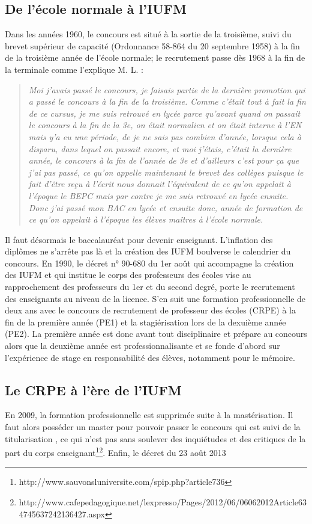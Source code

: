 \documentclass[a4paper,11pt]{article}
\begin{document}
			\subsection{De l'école normale à l'IUFM}
					Dans les années 1960, le concours est situé à la sortie de la troisième, suivi du brevet supérieur de capacité (Ordonnance 58-864 du 20 septembre 1958) à la fin de la troisième année de l'école normale; le recrutement passe dès 1968 à la fin de la terminale comme l'explique M. L. :
			\begin{quote}
			\emph{Moi j'avais passé le concours, je faisais partie de la dernière promotion qui a passé le concours à la fin de la troisième. Comme c'était tout à fait la fin de ce cursus, je me suis retrouvé en lycée parce qu'avant quand on passait le concours à la fin de la 3e, on était normalien et on était interne à l'EN mais y'a eu une période, de je ne sais pas combien d'année, lorsque cela à disparu, dans lequel on passait encore, et moi j'étais, c'était la dernière année, le concours à la fin de l'année de 3e et d'ailleurs c'est pour ça que j'ai pas passé, ce qu'on appelle maintenant le brevet des collèges puisque le fait d'être reçu à l'écrit nous donnait l'équivalent de ce qu'on appelait à l'époque le BEPC mais par contre je me suis retrouvé en lycée ensuite. Donc j'ai passé mon BAC en lycée et ensuite donc, année de formation de ce qu'on appelait à l'époque les élèves maîtres à l'école normale.}
			\end{quote}
			Il faut désormais le baccalauréat pour devenir enseignant. L'inflation des diplômes ne s'arrête pas là et la création des IUFM boulverse le calendrier du concours. En 1990, le décret n° 90-680 du 1er août qui accompagne la création des IUFM et qui institue le corps des professeurs des écoles vise au rapprochement des professeurs du 1er et du second degré, porte le recrutement des enseignants au niveau de la licence. S'en suit une formation professionnelle de deux ans avec le concours de recrutement de professeur des écoles (CRPE) à la fin de la première année (PE1) et la stagiérisation lors de la dexuième année (PE2). La première année est donc avant tout disciplinaire et prépare au concours alors que la deuxième année est professionnalisante et se fonde d'abord sur l'expérience de stage en responsabilité des élèves, notamment pour le mémoire.
			\subsection{Le CRPE à l'ère de l'IUFM}
			En 2009, la formation professionnelle est supprimée suite à la mastérisation. Il faut alors posséder un master pour pouvoir passer le concours qui est suivi de la titularisation , ce qui n'est pas sans soulever des inquiétudes et des critiques de la part du corps enseignant\footnote{http://www.sauvonsluniversite.com/spip.php?article736}\footnote{http://www.cafepedagogique.net/lexpresso/Pages/2012/06/06062012Article634745637242136427.aspx}. Enfin, le décret du 23 août 2013
			
\end{document}
